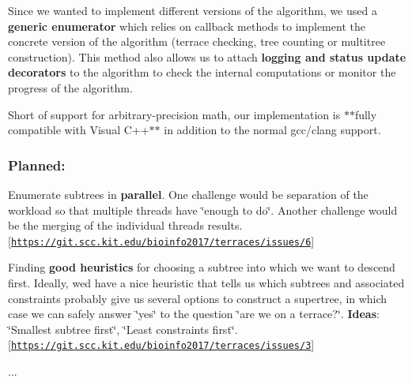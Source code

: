 \begin{DoxyItemize}
\item Since we wanted to implement different versions of the algorithm, we used a {\bfseries generic enumerator} which relies on callback methods to implement the concrete version of the algorithm (terrace checking, tree counting or multitree construction). This method also allows us to attach {\bfseries logging and status update decorators} to the algorithm to check the internal computations or monitor the progress of the algorithm.
\item Short of support for arbitrary-\/precision math, our implementation is $\ast$$\ast$fully compatible with Visual C++$\ast$$\ast$ in addition to the normal gcc/clang support.
\end{DoxyItemize}

\subsubsection*{Planned\+:}


\begin{DoxyItemize}
\item Enumerate subtrees in {\bfseries parallel}. One challenge would be separation of the workload so that multiple threads have \char`\"{}enough to do\char`\"{}. Another challenge would be the merging of the individual threads\textquotesingle{} results. \mbox{[}\href{https://git.scc.kit.edu/bioinfo2017/terraces/issues/6}{\tt https\+://git.\+scc.\+kit.\+edu/bioinfo2017/terraces/issues/6}\mbox{]}
\item Finding {\bfseries good heuristics} for choosing a subtree into which we want to descend first. Ideally, we\textquotesingle{}d have a nice heuristic that tells us which subtrees and associated constraints probably give us several options to construct a supertree, in which case we can safely answer \char`\"{}yes\char`\"{} to the question \char`\"{}are we on a terrace?\char`\"{}. {\bfseries Ideas}\+: \char`\"{}\+Smallest subtree first\char`\"{}, \char`\"{}\+Least constraints first\char`\"{}. \mbox{[}\href{https://git.scc.kit.edu/bioinfo2017/terraces/issues/3}{\tt https\+://git.\+scc.\+kit.\+edu/bioinfo2017/terraces/issues/3}\mbox{]}
\item ... 
\end{DoxyItemize}